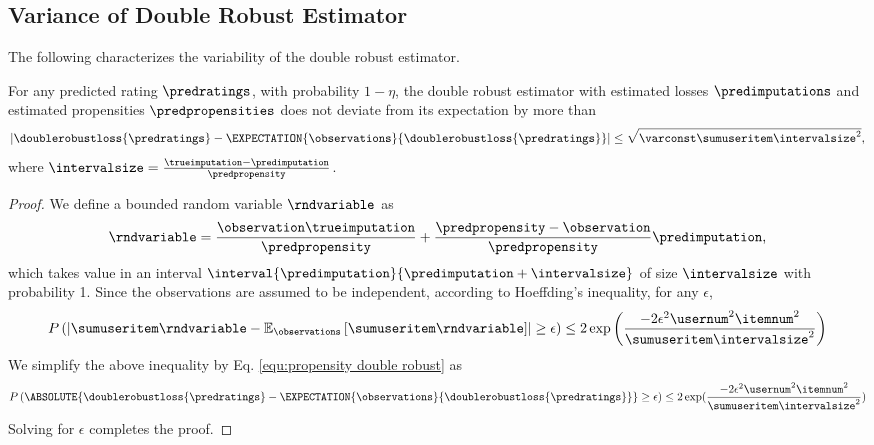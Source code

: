 \subsection{Variance of Double Robust Estimator}
The following characterizes the variability of the double robust estimator.
\begin{lemma}
For any predicted rating $\predratings$, with probability $1-\eta$, the double robust estimator with estimated losses $\predimputations$ and estimated propensities $\predpropensities$ does not deviate from its expectation by more than
\begin{equation}
|\doublerobustloss{\predratings}-\EXPECTATION{\observations}{\doublerobustloss{\predratings}}|
\leq
\sqrt{
\varconst\sumuseritem\intervalsize^{2}
}
\text{,}
\end{equation}%
where $\intervalsize=\frac{\trueimputation-\predimputation}{\predpropensity}$.
\begin{proof}
We define a bounded random variable $\rndvariable$ as
\begin{equation}
\rndvariable
=
\frac{\observation\trueimputation}{\predpropensity}
+
\frac{\predpropensity-\observation}{\predpropensity}\predimputation
\text{,}
\end{equation}%
which takes value in an interval $\interval{\predimputation}{\predimputation+\intervalsize}$ of size $\intervalsize$ with probability 1.
Since the observations are assumed to be independent, according to Hoeffding's inequality, for any $\epsilon$,
\begin{equation*}
P
\left(
\left|
\sumuseritem\rndvariable
-
\mathbb{E}_{\observations}
\left[
\sumuseritem\rndvariable
\right]
\right|
\geq\epsilon
\right)
\leq
2\exp
\left(\frac{-2\epsilon^{2}\usernum^{2}\itemnum^{2}}{\sumuseritem\intervalsize^{2}}
\right)
\end{equation*}%
We simplify the above inequality by Eq. \ref{equ:propensity double robust} as
\begin{equation*}
P\left(
\ABSOLUTE{
\doublerobustloss{\predratings}-\EXPECTATION{\observations}{\doublerobustloss{\predratings}}
}
\geq\epsilon
\right)
\leq
2\exp(\frac{-2\epsilon^{2}\usernum^{2}\itemnum^{2}}{\sumuseritem\intervalsize^{2}})
\end{equation*}%
Solving for $\epsilon$ completes the proof.
\end{proof}
\end{lemma}
